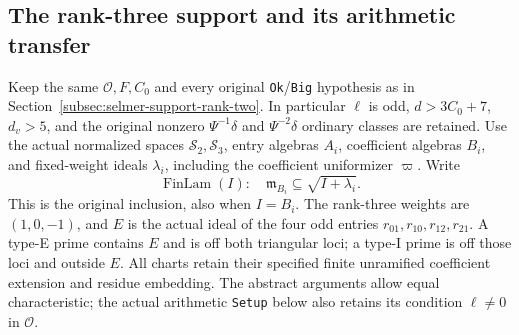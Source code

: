 \subsection{The rank-three support and its arithmetic transfer}
\label{subsec:selmer-support-rank-three}

Keep the same $\mathcal O,F,C_0$ and every original
\texttt{Ok}/\texttt{Big} hypothesis as in
Section~\ref{subsec:selmer-support-rank-two}.  In particular
$\ell$ is odd, $d>3C_0+7$, $d_v>5$, and the original nonzero
$\Psi^{-1}\delta$ and $\Psi^{-2}\delta$ ordinary classes are retained.
Use the actual normalized spaces $\mathscr S_2,\mathscr S_3$,
entry algebras $A_i$, coefficient algebras $B_i$, and fixed-weight
ideals $\lambda_i$, including the coefficient uniformizer $\varpi$.
Write
\[
 \operatorname{FinLam}(I):\quad
 \mathfrak m_{B_i}\subseteq\sqrt{I+\lambda_i}.
\]
This is the original inclusion, also when $I=B_i$.
The rank-three weights are $(1,0,-1)$, and $E$ is the actual ideal
of the four odd entries $r_{01},r_{10},r_{12},r_{21}$.
A type-E prime contains $E$ and is off both triangular loci;
a type-I prime is off those loci and outside $E$.
All charts retain their specified finite unramified coefficient
extension and residue embedding.  The abstract arguments allow
equal characteristic; the actual arithmetic \texttt{Setup} below
also retains its condition $\ell\ne0$ in $\mathcal O$.
\cite{support-rankthree-source}

